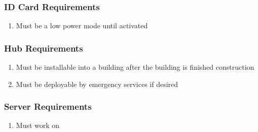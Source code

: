\subsubsection{ID Card Requirements}
	\begin{enumerate}
		\item Must be a low power mode until activated
	\end{enumerate}
\subsubsection{Hub Requirements}
	\begin{enumerate}
		\item Must be installable into a building after the building is finished construction
		\item Must be deployable by emergency services if desired
	\end{enumerate}
\subsubsection{Server Requirements}
	\begin{enumerate}
		\item Must work on
	\end{enumerate}
